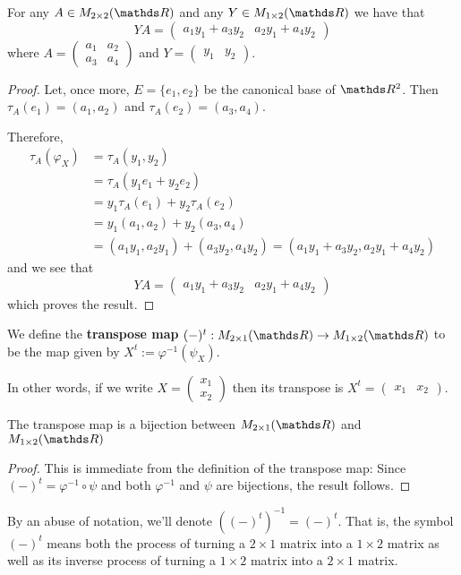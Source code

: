 \begin{lemma}
	For any $A\in M_{2\times 2}(\R)$ and any $Y\in M_{1\times 2}(\R)$ we have that \[YA=\begin{pmatrix}
	a_1y_1+a_3y_2&
	a_2y_1+a_4y_2
	\end{pmatrix}\]where $A=\begin{pmatrix}
	a_1&a_2\\
	a_3&a_4
	\end{pmatrix}$ and $Y=\begin{pmatrix}
	y_1&y_2
	\end{pmatrix}$.
\end{lemma}
\begin{proof}
	Let, once more, $E=\{e_1,e_2\}$ be the canonical base of $\R^2$. Then $\tau_A(e_1)=(a_1,a_2)$ and $\tau_A(e_2)=(a_3,a_4)$.
	
	Therefore,
	\begin{align*}
	\tau_A(\varphi_X)&=\tau_A(y_1,y_2)\\
	&=\tau_A(y_1e_1+y_2e_2)\\
	&=y_1\tau_A(e_1)+y_2\tau_A(e_2)\\
	&=y_1(a_1,a_2)+y_2(a_3,a_4)\\
	&=(a_1y_1,a_2y_1)+(a_3y_2,a_4y_2)=(a_1y_1+a_3y_2,a_2y_1+a_4y_2)
	\end{align*}and we see that \[YA=\begin{pmatrix}
	a_1y_1+a_3y_2&
	a_2y_1+a_4y_2
	\end{pmatrix}\]which proves the result.
\end{proof}

\begin{df}
	We define the \textbf{transpose map} $(-)^t:M_{2\times 1}(\R)\to M_{1\times 2}(\R)$ to be the map given by $X^t:=\varphi^{-1}(\psi_X)$.
	
	In other words, if we write $X=\begin{pmatrix}
	x_1\\x_2
	\end{pmatrix}$ then its transpose is $X^t=\begin{pmatrix}
	x_1&x_2
	\end{pmatrix}$.
\end{df}
\begin{prop}
	The transpose map is a bijection between $M_{2\times 1}(\R)$ and $M_{1\times 2}(\R)$
\end{prop}
\begin{proof}
	This is immediate from the definition of the transpose map: Since $(-)^t=\varphi^{-1}\circ \psi$ and both $\varphi^{-1}$ and $\psi$ are bijections, the result follows.
\end{proof}
\begin{df}
	By an abuse of notation, we'll denote $((-)^t)^{-1}=(-)^t$. That is, the symbol $(-)^t$ means both the process of turning a $2\times 1$ matrix into a $1\times 2$ matrix as well as its inverse process of turning a $1\times 2$ matrix into a $2\times 1$ matrix.
\end{df}

